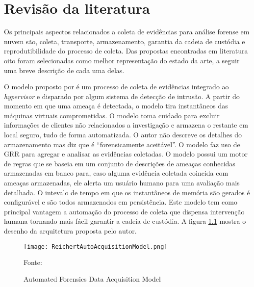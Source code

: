 \chapter{Revisão da literatura}
\label{chp:revisão}


Os principais aspectos relacionados a coleta de evidências para análise forense em nuvem são, coleta, transporte, armazenamento, garantia da cadeia de custódia e reprodutibilidade do processo de coleta. 
%
Das propostas encontradas em literatura oito foram selecionadas como melhor representação do estado da arte, a seguir uma breve descrição de cada uma delas.

%
O modelo proposto por \cite{ReichertAutoAcquisition:2015} é um processo de coleta de evidências integrado ao \textit{hypervisor} e disparado por algum sistema de detecção de intrusão. 
%
A partir do momento em que uma ameaça é detectada, o modelo tira instantâneos das máquinas virtuais comprometidas. O modelo toma cuidado para excluir informações de clientes não relacionados a investigação e armazena o restante em local seguro, tudo de forma automatizada.
%
O autor não descreve os detalhes do armazenamento mas diz que é ``forensicamente aceitável''.
%
O modelo faz uso de GRR para agregar e analisar as evidências coletadas. 
%
O modelo possui um motor de regras que se baseia em um conjunto de descrições de ameaças conhecidas armazenadas em banco para, caso alguma evidência coletada coincida com ameaças armazenadas, ele alerta um usuário humano para uma avaliação mais detalhada.
%
O intevalo de tempo em que os instantâneos de memória são gerados é configurável e são todos armazenados em persistência.
%
Este modelo tem como principal vantagem a automação do processo de coleta que dispensa intervenção humana tornando mais fácil garantir a cadeia de custódia. 
%
A figura \ref{fig:ReichertAutoAcquisitionModel} mostra o desenho da arquitetura proposta pelo autor.

\begin{figure}[htb!]
\footnotesize
\caption{Automated Forensics Data Acquisition Model}
\texttt{[image: ReichertAutoAcquisitionModel.png]}
\centering
\label{fig:ReichertAutoAcquisitionModel}
\begin{center}
Fonte: \cite{ReichertAutoAcquisition:2015} 
\end{center}
\end{figure}

